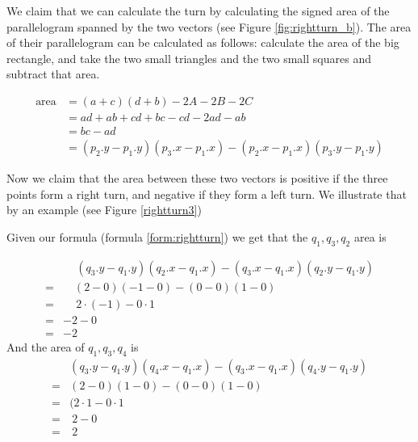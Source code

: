 We claim that we can calculate the turn by calculating the signed area of the
parallelogram spanned by the two vectors (see Figure \ref{fig:rightturn_b}). The area of their parallelogram can
be calculated as follows: calculate the area of the big rectangle, and take the
two small triangles and the two small squares and subtract that area.

\begin{align}
	\text{area} &= (a+c)(d+b)-2A-2B-2C\nonumber\\
							&=ad+ab+cd+bc-cd-2ad-ab\nonumber\\
							&=bc-ad \nonumber\\
							&=(p_2.y-p_1.y)(p_3.x-p_1.x)-(p_2.x-p_1.x)(p_3.y-p_1.y)\label{form:rightturn}
\end{align}

Now we claim that the area between these two vectors is positive if the
three points form a right turn, and negative if they form a left turn. We
illustrate that by an example (see Figure \ref{rightturn3})

Given our formula (formula \ref{form:rightturn}) we get that the $q_1,q_3,q_2$ area is

\begin{align*}
	&\quad\,(q_3.y-q_1.y)(q_2.x-q_1.x)-(q_3.x-q_1.x)(q_2.y-q_1.y)\\ 
	= & \quad(2-0)(-1-0)-(0-0)(1-0)\\
	= & \quad\, 2\cdot (-1)-0\cdot1\\
	= & -2-0\\
	= & -2
\end{align*}
And the area of $q_1,q_3,q_4$ is
\begin{align*}
	&(q_3.y-q_1.y)(q_4.x-q_1.x)-(q_3.x-q_1.x)(q_4.y-q_1.y)\\ 
	= &(2-0)(1-0)-(0-0)(1-0)\\
	= &(2\cdot 1 - 0\cdot 1\\
	= &\ 2-0\\
	= &\ 2
\end{align*}

